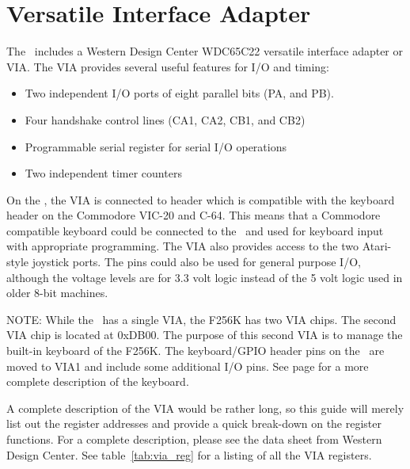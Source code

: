 \chapter{Versatile Interface Adapter}
\label{chap_via}

The \jr\ includes a Western Design Center WDC65C22 versatile interface adapter or VIA. The VIA provides several useful features for I/O and timing:

\begin{itemize}
    \item Two independent I/O ports of eight parallel bits (PA, and PB).

    \item Four handshake control lines (CA1, CA2, CB1, and CB2)

    \item Programmable serial register for serial I/O operations

    \item Two independent timer counters
\end{itemize}

On the \jr, the VIA is connected to header which is compatible with the keyboard header on the Commodore VIC-20 and C-64. This means that a Commodore compatible keyboard could be connected to the \jr\ and used for keyboard input with appropriate programming. The VIA also provides access to the two Atari-style joystick ports. The pins could also be used for general purpose I/O, although the voltage levels are for 3.3 volt logic instead of the 5 volt logic used in older 8-bit machines.

\begin{leftbar}
    NOTE: While the \jr\ has a single VIA, the F256K has two VIA chips. The second VIA chip is located at 0xDB00. The purpose of this second VIA is to manage the built-in keyboard of the F256K. The keyboard/GPIO header pins on the \jr\ are moved to VIA1 and include some additional I/O pins. See page \pageref{sec_f256k_kbd} for a more complete description of the keyboard.
\end{leftbar}

A complete description of the VIA would be rather long, so this guide will merely list out the register addresses and provide a quick break-down on the register functions. For a complete description, please see the data sheet from Western Design Center. See table~\ref{tab:via_reg} for a listing of all the VIA registers.

